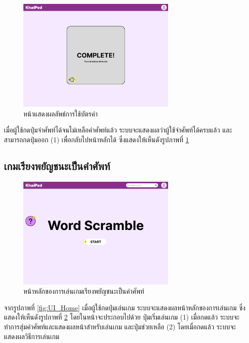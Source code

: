 \documentclass[12pt,oneside,openright,a4paper]{cpe-thai-project}
\begin{document}
\pagebreak
\begin{figure}[!h]\centering
	\includegraphics[width=0.7\textwidth, keepaspectratio=true]{image/chap3/ui/flashcard/Flashcard - Complete.png}
	\caption{หน้าแสดงผลลัพธ์การใช้บัตรคำ}\label{fig:UI_FlashcardResult}
\end{figure}
\hspace{1cm}
เมื่อผู้ใช้กดปุ่มจำศัพท์ได้จนไม่เหลือคำศัพท์แล้ว ระบบจะแสดงผลว่าผู้ใช้จำศัพท์ได้ครบแล้ว และสามารถกดปุ่มออก (1) เพื่อกลับไปหน้าหลักได้ ซึ่งแสดงให้เห็นดังรูปภาพที่ \ref{fig:UI_FlashcardResult}

\pagebreak
\subsection{เกมเรียงพยัญชนะเป็นคำศัพท์}
\begin{figure}[!h]\centering
	\includegraphics[width=0.7\textwidth, keepaspectratio=true]{image/chap3/ui/game/Word Scramble.png}
	\caption{หน้าหลักของการเล่นเกมเรียงพยัญชนะเป็นคำศัพท์}\label{fig:UI_Game}
\end{figure}
\hspace{1cm}
จากรูปภาพที่ \ref{fig:UI_Home} เมื่อผู้ใช้กดปุ่มเล่นเกม ระบบจะแสดงผลหน้าหลักของการเล่นเกม ซึ่งแสดงให้เห็นดังรูปภาพที่ \ref{fig:UI_Game} โดยในหน้าจะประกอบไปด้วย
ปุ่มเริ่มเล่นเกม (1) เมื่อกดแล้ว ระบบจะทำการสุ่มคำศัพท์และแสดงผลหน้าสำหรับเล่นเกม และปุ่มช่วยเหลือ (2) โดยเมื่อกดแล้ว ระบบจะแสดงผลวิธีการเล่นเกม
\end{document}
